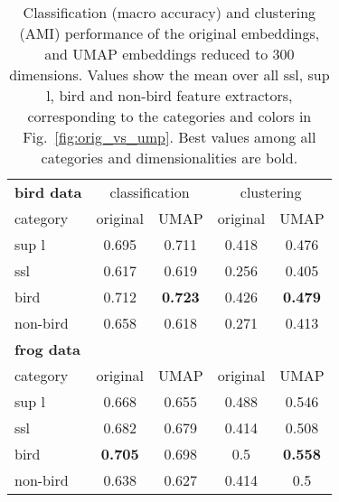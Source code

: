 \begin{table}[t]
  
  \caption{Classification (macro accuracy) and clustering (AMI) performance of the original embeddings, and UMAP embeddings reduced to 300 dimensions. Values show the mean over all ssl, sup l, bird and non-bird feature extractors, corresponding to the categories and colors in Fig.~\ref{fig:orig_vs_ump}. Best values among all categories and dimensionalities are bold.}
  \label{tab:results}
  \centering
  \begin{tabular}{l|cc|cc}
    \hline
    \textbf{bird data}& \multicolumn{2}{c|}{classification} & \multicolumn{2}{c}{clustering}\\
    category &
    original &
    UMAP &
    original &
    UMAP \\
    \hline
    sup l & 0.695 & {0.711} & 0.418 & {0.476}\\
    ssl & 0.617 & {0.619} & 0.256 & {0.405}\\
    bird & 0.712 & {\textbf{0.723}} & 0.426 & {\textbf{0.479}}\\
    non-bird & {0.658} & 0.618 & 0.271 & {0.413}\\
    \textbf{frog data}& &&& \\
    category &
    original &
    UMAP &
    original &
    UMAP \\
    \hline
    sup l & {0.668} & 0.655 & 0.488 & {0.546}\\
    ssl & {0.682} & 0.679 & 0.414 & {0.508}\\
    bird & {\textbf{0.705}} & 0.698 & 0.5 & {\textbf{0.558}}\\
    non-bird & 0.638 & 0.627 & 0.414 & {0.5}\\
    
    
  \end{tabular}
\end{table}